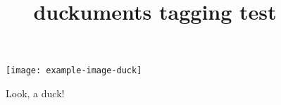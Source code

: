 \documentclass{article}
\title{duckuments tagging test}
\begin{document}
\begin{figure}
\centering
\texttt{[image: example-image-duck]}
\caption{Look, a duck!}
\end{figure}

\duckument
\end{document}
